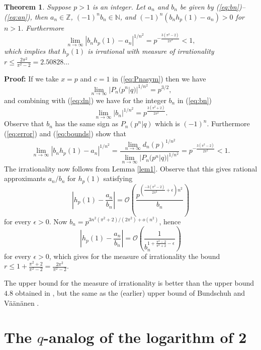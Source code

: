\documentclass[12pt]{article}
\newtheorem{theorem}{Theorem}
\begin{document}
\begin{theorem}  \label{thm1}
Suppose $p>1$ is an integer.
Let $a_n$ and $b_n$ be given by (\ref{eq:bn})--(\ref{eq:an}), then
$a_n \in \mathbb{Z}$, $(-1)^n b_n \in \mathbb{N}$, and
$(-1)^n (b_n h_p(1) -a_n) > 0$ for $n >1$. Furthermore
\[ \lim_{n \to \infty} |b_n h_p(1) - a_n|^{1/n^2} = p^{-\frac{3(\pi^2-2)}{2\pi^2}} < 1, \]
which implies that $h_p(1)$ is irrational with measure of
irrationality $r \leq \frac{2\pi^2}{\pi^2-2} = 2.50828\ldots$
\end{theorem}
\textbf{Proof:}
If we take $x=p$ and $c=1$ in (\ref{eq:Pnasym}) then we have
\[  \lim_{n \to \infty} |P_n(p^n|q)|^{1/n^2} = p^{3/2}, \]
and combining with (\ref{eq:dn}) we have for the integer $b_n$ in (\ref{eq:bn}) 
\[  \lim_{n \to \infty}  |b_n|^{1/n^2} = p^{\frac{3(\pi^2+2)}{2\pi^2}}.  \]
Observe that $b_n$ has the same sign as $P_n(p^n|q)$ which
is $(-1)^n$. Furthermore (\ref{eq:error}) and (\ref{eq:bounds}) show that
\[  \lim_{n\to \infty} |b_n h_p(1)-a_n|^{1/n^2} = 
 \frac{\lim_{n \to \infty} d_n(p)^{1/n^2}}
 {\lim_{n\to \infty} |P_n(p^n|q)|^{1/n^2}} = p^{-\frac{3(\pi^2-2)}{2\pi^2}}<1. \]
The irrationality now follows from Lemma \ref{lem1}. Observe that
this gives rational approximants $a_n/b_n$ for $h_p(1)$ satisfying
\[   | h_p(1) - \frac{a_n}{b_n} | = 
\mathcal{O} \left(\frac{p^{(\frac{-3(\pi^2-2)}{2\pi^2}+\epsilon)n^2}}{b_n} \right) \]
for every $\epsilon > 0$. Now $b_n = p^{3n^2(\pi^2+2)/(2\pi^2) + o(n^2)}$, hence
\[   |h_p(1) - \frac{a_n}{b_n} | = \mathcal{O}
  \left( \frac{1}{b_n^{1+\frac{\pi^2-2}{\pi^2+2} - \epsilon}} \right) \]
for every $\epsilon > 0$, which gives for the measure of
irrationality the bound $r \leq 1 + \frac{\pi^2+2}{\pi^2-2} = \frac{2\pi^2}{\pi^2-2}$. \ \framebox{}  

\bigskip
The upper bound for the measure of irrationality is better than the upper bound
$4.8$ obtained in \cite{WZ}, but the same as the (earlier) upper bound of
Bundschuh and V\"a\"an\"anen \cite{BV}.
      
\section{The $q$-analog of the logarithm of 2}
\end{document}
